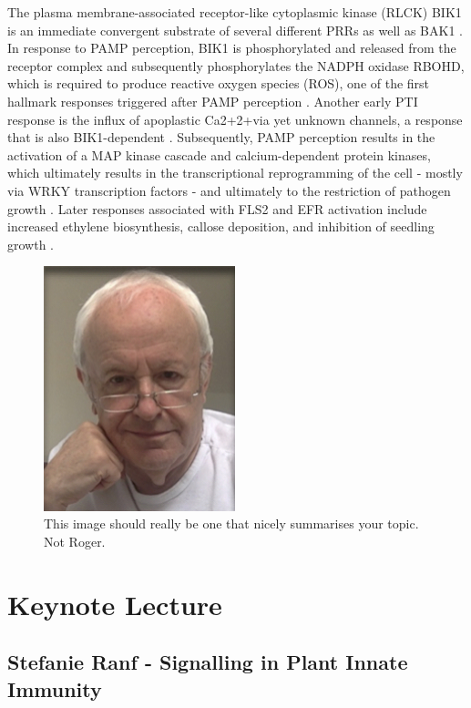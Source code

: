 \documentclass[12pt,]{book}
\begin{document}
The plasma membrane-associated receptor-like cytoplasmic kinase (RLCK)
BIK1 is an immediate convergent substrate of several different PRRs as
well as BAK1 \citep{Couto:2016kq}. In response to PAMP perception, BIK1
is phosphorylated and released from the receptor complex and
subsequently phosphorylates the NADPH oxidase RBOHD, which is required
to produce reactive oxygen species (ROS), one of the first hallmark
responses triggered after PAMP perception
\citep{Kadota:2014bi, Li:2014dx}. Another early PTI response is the
influx of apoplastic Ca2+2+via yet unknown channels, a response that is
also BIK1-dependent \citep{Li:2014dx, Ranf:2014fg, Seybold:2014wt}.
Subsequently, PAMP perception results in the activation of a MAP kinase
cascade and calcium-dependent protein kinases, which ultimately results
in the transcriptional reprogramming of the cell - mostly via WRKY
transcription factors - and ultimately to the restriction of pathogen
growth \citep{Couto:2016kq}. Later responses associated with FLS2 and
EFR activation include increased ethylene biosynthesis, callose
deposition, and inhibition of seedling growth \citep{Boller:2009hu}.

\begin{figure}
\includegraphics[width=2.19in]{assets/RPF-thumbnail} \caption{This image should really be one that nicely summarises your topic. Not Roger.}\label{fig:mainsi}
\end{figure}

\section*{Keynote Lecture}\label{keynote-lecture-3}

\subsection*{Stefanie Ranf - Signalling in Plant Innate
Immunity}\label{stefanie-ranf---signalling-in-plant-innate-immunity}
\end{document}
